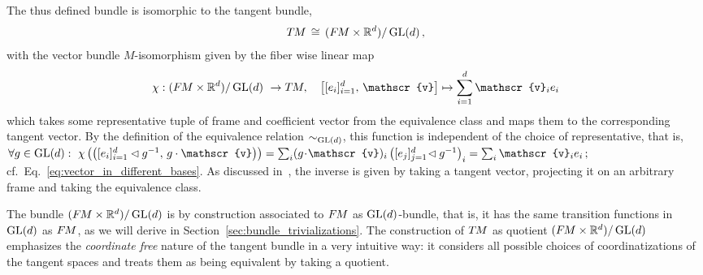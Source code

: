 The thus defined bundle is isomorphic to the tangent bundle,
\begin{align}
    T\mkern-1.5muM\, \cong\, (F\mkern-1.5muM\times\mathbb{R}^d)/\operatorname{GL}(d) \,,
\end{align}
with the vector bundle $M$-isomorphism given by the fiber wise linear map
\begin{align}\label{eq:A_TM_isomorphism}
    \chi:(\FM\times\R^d)/\GL{d}\ \to \TM,\ \ \ \left[[e_i]_{i=1}^d,\, \mathscr{v}\right] \mapsto \sum_{i=1}^d \mathscr{v}_i e_i
\end{align}
which takes some representative tuple of frame and coefficient vector from the equivalence class and maps them to the corresponding tangent vector.
By the definition of the equivalence relation $\sim_{\operatorname{GL}(d)}$, this function is independent of the choice of representative, that is,
$
    \forall g\in \GL{d}: \ 
    \chi\left( \big([e_i]_{i=1}^d\lhd g^{-1},\, g\cdot \mathscr{v}\big) \right) = 
    {\sum_i (g\!\cdot\!\mathscr{v})_i \left([e_j]_{j=1}^d\!\lhd g^{-1}\right)_i} =
    \sum_i \mathscr{v}_i e_i \, ;\,
$
cf.~Eq.~\eqref{eq:vector_in_different_bases}.
As discussed in~\cite{schullerGeometricalAnatomy2016}, the inverse is given by taking a tangent vector, projecting it on an arbitrary frame and taking the equivalence class.


The bundle $(F\mkern-1.5muM \times \mathbb{R}^d) / \operatorname{GL}(d)$ is by construction associated to $F\mkern-1.5muM$ as $\operatorname{GL}(d)$-bundle, that is, it has the same transition functions in $\operatorname{GL}(d)$ as $F\mkern-1.5muM$, as we will derive in Section~\ref{sec:bundle_trivializations}.
The construction of $T\mkern-1.5muM$ as quotient $(F\mkern-1.5muM\times\mathbb{R}^d)/\operatorname{GL}(d)$ emphasizes the \emph{coordinate free} nature of the tangent bundle in a very intuitive way:
it considers all possible choices of coordinatizations of the tangent spaces and treats them as being equivalent by taking a quotient.
